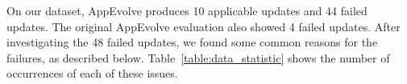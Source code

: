 On our dataset, AppEvolve produces 10 applicable updates and 44 failed
updates. The original AppEvolve evaluation also showed 4 failed updates.
After investigating the 48 failed updates, we found some common reasons for
the failures, as described below. Table~\ref{table:data_statistic} shows
the number of occurrences of each of these issues.


